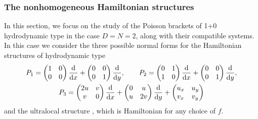 \documentclass[10pt,a4paper]{amsart}
\numberwithin{equation}{section}
\begin{document}
\subsubsection{The nonhomogeneous Hamiltonian structures}
In this section, we focus on the study of the Poisson brackets of 1+0 hydrodynamic type in the case $D=N=2$, along with their compatible systems. In this case we consider the three possible normal forms for the Hamiltonian structures of hydrodynamic type \cite{ferapontov2011classification,mokhov2008classification}
\begin{gather*}
P_1=\begin{pmatrix} 1&0\\0&0\\ \end{pmatrix} \frac{\rm d}{{\rm d}x}+\begin{pmatrix} 0&0\\0&1\\ \end{pmatrix} \frac{\rm d}{{\rm d}y},\qquad
P_2=\begin{pmatrix} 0&1\\1&0\\ \end{pmatrix} \frac{\rm d}{{\rm d}x}+\begin{pmatrix} 0&0\\0&1\\ \end{pmatrix} \frac{\rm d}{{\rm d}y},\\
P_3=\begin{pmatrix} 2u&v\\v&0\\ \end{pmatrix} \frac{\rm d}{{\rm d}x}+\begin{pmatrix} 0&u\\u&2v\\ \end{pmatrix} \frac{\rm d}{{\rm d}y}+\begin{pmatrix} u_x&u_y\\v_x&v_y\\ \end{pmatrix}
\end{gather*}
and the ultralocal structure
,
which is Hamiltonian for any choice of $f$.
\end{document}
